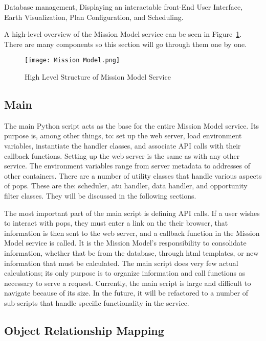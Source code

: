 \begin{outline} 
    \1 Database management,
    \1 Displaying an interactable front-End User Interface,
    \1 Earth Visualization,
    \1 Plan Configuration, and
    \1 Scheduling.
\end{outline}

A high-level overview of the Mission Model service can be seen in
Figure~\ref{fig:mission_model}. There are many components so this section will
go through them one by one.

\begin{figure}[h]
    \centering
    \texttt{[image: Mission Model.png]} 
    \caption{High Level Structure of Mission Model Service}
    \label{fig:mission_model} 
\end{figure}


\subsection{Main} 

The main Python script acts as the base for the entire Mission Model service.
Its purpose is, among other things, to: set up the web server, load environment
variables, instantiate the handler classes, and associate API calls with their
callback functions. Setting up the web server is the same as with any other
service. The environment variables range from server metadata to addresses of
other containers. There are a number of utility classes that handle various
aspects of \gls{pops}. These are the: scheduler, \gls{atu} handler, data
handler, and opportunity filter classes. They will be discussed in the
following sections. 

The most important part of the main script is defining API calls. If a user
wishes to interact with \gls{pops}, they must enter a link on the their
browser, that information is then sent to the web server, and a callback
function in the Mission Model service is called. It is the Mission Model's
responsibility to consolidate information, whether that be from the database,
through \gls{html} templates, or new information that must be calculated.  The
main script does very few actual calculations; its only purpose is to organize
information and call functions as necessary to serve a request.  Currently, the
main script is large and difficult to navigate because of its size.  In the
future, it will be refactored to a number of sub-scripts that handle specific
functionality in the service.

\subsection{Object Relationship Mapping}\label{sec:orm}

